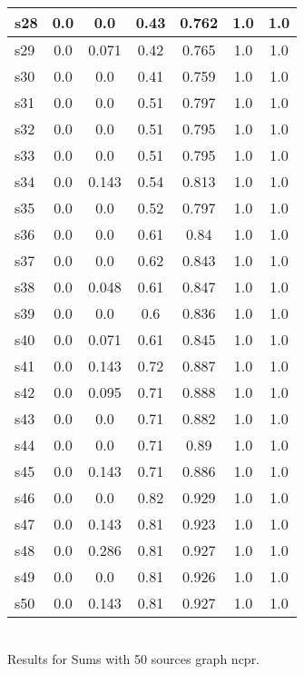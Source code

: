 \documentclass{article}
\begin{document}
\begin{tabular}{|l|c|c|c|c|c|c|}
\hline
s28 &0.0 & 0.0 & 0.43 & 0.762 & 1.0 & 1.0\\
\hline
s29 &0.0 & 0.071 & 0.42 & 0.765 & 1.0 & 1.0\\
\hline
s30 &0.0 & 0.0 & 0.41 & 0.759 & 1.0 & 1.0\\
\hline
s31 &0.0 & 0.0 & 0.51 & 0.797 & 1.0 & 1.0\\
\hline
s32 &0.0 & 0.0 & 0.51 & 0.795 & 1.0 & 1.0\\
\hline
s33 &0.0 & 0.0 & 0.51 & 0.795 & 1.0 & 1.0\\
\hline
s34 &0.0 & 0.143 & 0.54 & 0.813 & 1.0 & 1.0\\
\hline
s35 &0.0 & 0.0 & 0.52 & 0.797 & 1.0 & 1.0\\
\hline
s36 &0.0 & 0.0 & 0.61 & 0.84 & 1.0 & 1.0\\
\hline
s37 &0.0 & 0.0 & 0.62 & 0.843 & 1.0 & 1.0\\
\hline
s38 &0.0 & 0.048 & 0.61 & 0.847 & 1.0 & 1.0\\
\hline
s39 &0.0 & 0.0 & 0.6 & 0.836 & 1.0 & 1.0\\
\hline
s40 &0.0 & 0.071 & 0.61 & 0.845 & 1.0 & 1.0\\
\hline
s41 &0.0 & 0.143 & 0.72 & 0.887 & 1.0 & 1.0\\
\hline
s42 &0.0 & 0.095 & 0.71 & 0.888 & 1.0 & 1.0\\
\hline
s43 &0.0 & 0.0 & 0.71 & 0.882 & 1.0 & 1.0\\
\hline
s44 &0.0 & 0.0 & 0.71 & 0.89 & 1.0 & 1.0\\
\hline
s45 &0.0 & 0.143 & 0.71 & 0.886 & 1.0 & 1.0\\
\hline
s46 &0.0 & 0.0 & 0.82 & 0.929 & 1.0 & 1.0\\
\hline
s47 &0.0 & 0.143 & 0.81 & 0.923 & 1.0 & 1.0\\
\hline
s48 &0.0 & 0.286 & 0.81 & 0.927 & 1.0 & 1.0\\
\hline
s49 &0.0 & 0.0 & 0.81 & 0.926 & 1.0 & 1.0\\
\hline
s50 &0.0 & 0.143 & 0.81 & 0.927 & 1.0 & 1.0\\
\hline
\end{tabular}\\

\noindent Results for Sums with 50 sources graph ncpr.
\end{document}
